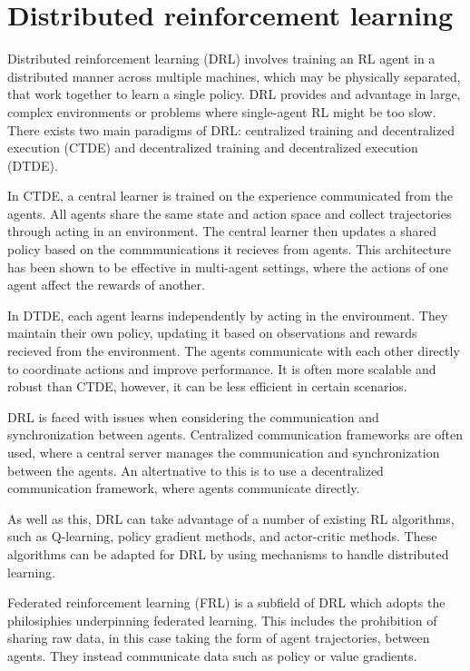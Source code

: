 \section{Distributed reinforcement learning}

Distributed reinforcement learning (DRL) involves training an RL agent in a distributed manner across multiple machines, which may be physically separated, that work together to learn a single policy. DRL provides and advantage in large, complex environments or problems where single-agent RL might be too slow.
There exists two main paradigms of DRL: centralized training and decentralized execution (CTDE) and decentralized training and decentralized execution (DTDE).

In CTDE, a central learner is trained on the experience communicated from the agents. All agents share the same state and action space and collect trajectories through acting in an environment. The central learner then updates a shared policy based on the commmunications it recieves from agents. This architecture has been shown to be effective in multi-agent settings, where the actions of one agent affect the rewards of another.

In DTDE, each agent learns independently by acting in the environment. They maintain their own policy, updating it based on observations and rewards recieved from the environment. The agents communicate with each other directly to coordinate actions and improve performance. It is often more scalable and robust than CTDE, however, it can be less efficient in certain scenarios.

DRL is faced with issues when considering the communication and synchronization between agents. Centralized communication frameworks are often used, where a central server manages the communication and synchronization between the agents. An altertnative to this is to use a decentralized communication framework, where agents communicate directly.

As well as this, DRL can take advantage of a number of existing RL algorithms, such as Q-learning, policy gradient methods, and actor-critic methods. These algorithms can be adapted for DRL by using mechanisms to handle distributed learning.

Federated reinforcement learning (FRL) is a subfield of DRL which adopts the philosiphies underpinning federated learning. This includes the prohibition of sharing raw data, in this case taking the form of agent trajectories, between agents. They instead communicate data such as policy or value gradients.

